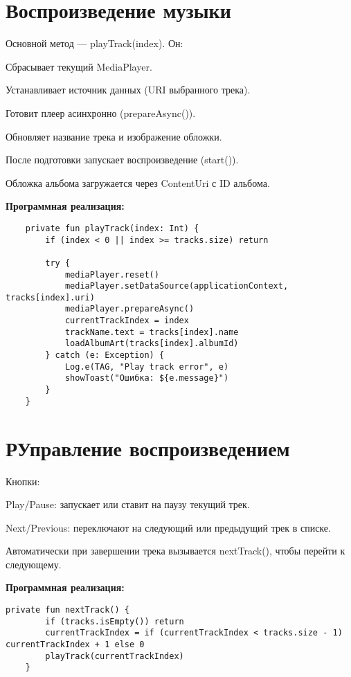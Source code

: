 \section{Воспроизведение музыки}

Основной метод — playTrack(index). Он:

Сбрасывает текущий MediaPlayer.

Устанавливает источник данных (URI выбранного трека).

Готовит плеер асинхронно (prepareAsync()).

Обновляет название трека и изображение обложки.

После подготовки запускает воспроизведение (start()).

Обложка альбома загружается через ContentUri с ID альбома.

\textbf{Программная реализация:}
\begin{verbatim}
	private fun playTrack(index: Int) {
        if (index < 0 || index >= tracks.size) return

        try {
            mediaPlayer.reset()
            mediaPlayer.setDataSource(applicationContext, tracks[index].uri)
            mediaPlayer.prepareAsync()
            currentTrackIndex = index
            trackName.text = tracks[index].name
            loadAlbumArt(tracks[index].albumId)
        } catch (e: Exception) {
            Log.e(TAG, "Play track error", e)
            showToast("Ошибка: ${e.message}")
        }
    }
\end{verbatim}

\section{РУправление воспроизведением}

Кнопки:

Play/Pause: запускает или ставит на паузу текущий трек.

Next/Previous: переключают на следующий или предыдущий трек в списке.

Автоматически при завершении трека вызывается nextTrack(), чтобы перейти к следующему.

\textbf{Программная реализация:}
\begin{verbatim}
private fun nextTrack() {
        if (tracks.isEmpty()) return
        currentTrackIndex = if (currentTrackIndex < tracks.size - 1) currentTrackIndex + 1 else 0
        playTrack(currentTrackIndex)
    }
\end{verbatim}

